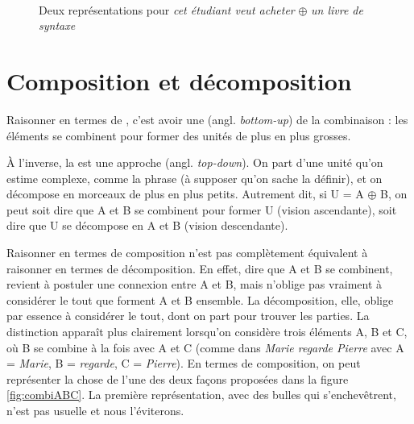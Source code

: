 \begin{figure}
\medskip\\
\caption{Deux représentations pour \textit{cet étudiant veut acheter} $\oplus$ \textit{un livre de syntaxe}}
\end{figure}



\section{Composition et décomposition}\label{sec:3.2.13}

Raisonner en termes de , c’est avoir une  (angl. \textit{bottom-up}) de la combinaison : les éléments se combinent pour former des unités de plus en plus grosses.

À l’inverse, la  est une approche  (angl. \textit{top-down}). On part d’une unité qu’on estime complexe, comme la phrase (à supposer qu’on sache la définir), et on décompose en morceaux de plus en plus petits. Autrement dit, si U = A ${\oplus}$ B, on peut soit dire que A et B se combinent pour former U (vision ascendante), soit dire que U se décompose en A et B (vision descendante).

Raisonner en termes de composition n’est pas complètement équivalent à raisonner en termes de décomposition. En effet, dire que A et B se combinent, revient à postuler une connexion entre A et B, mais n’oblige pas vraiment à considérer le tout que forment A et B ensemble. La décomposition, elle, oblige par essence à considérer le tout, dont on part pour trouver les parties. La distinction apparaît plus clairement lorsqu’on considère trois éléments A, B et C, où B se combine à la fois avec A et C (comme dans \textit{Marie regarde Pierre} avec A = \textit{Marie}, B = \textit{regarde}, C = \textit{Pierre}). En termes de composition, on peut représenter la chose de l’une des deux façons proposées dans la figure \ref{fig:combiABC}. La première représentation, avec des bulles qui s’enchevêtrent, n’est pas usuelle et nous l’éviterons.


